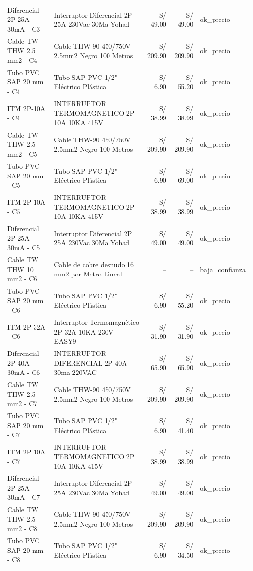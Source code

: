 \documentclass[11pt,a4paper]{article}
\begin{document}
\begin{longtable}{p{} p{} r r p{}}
Diferencial 2P-25A-30mA - C3 & Interruptor Diferencial 2P 25A 230Vac 30Ma Yohad & S/ 49.00 & S/ 49.00 & ok\_precio \\
Cable TW THW 2.5 mm2 - C4 & Cable THW-90 450/750V 2.5mm2 Negro 100 Metros & S/ 209.90 & S/ 209.90 & ok\_precio \\
Tubo PVC SAP 20 mm - C4 & Tubo SAP PVC 1/2" Eléctrico Plástica & S/ 6.90 & S/ 55.20 & ok\_precio \\
ITM 2P-10A - C4 & INTERRUPTOR TERMOMAGNETICO 2P 10A 10KA 415V & S/ 38.99 & S/ 38.99 & ok\_precio \\
Cable TW THW 2.5 mm2 - C5 & Cable THW-90 450/750V 2.5mm2 Negro 100 Metros & S/ 209.90 & S/ 209.90 & ok\_precio \\
Tubo PVC SAP 20 mm - C5 & Tubo SAP PVC 1/2" Eléctrico Plástica & S/ 6.90 & S/ 69.00 & ok\_precio \\
ITM 2P-10A - C5 & INTERRUPTOR TERMOMAGNETICO 2P 10A 10KA 415V & S/ 38.99 & S/ 38.99 & ok\_precio \\
Diferencial 2P-25A-30mA - C5 & Interruptor Diferencial 2P 25A 230Vac 30Ma Yohad & S/ 49.00 & S/ 49.00 & ok\_precio \\
Cable TW THW 10 mm2 - C6 & Cable de cobre desnudo 16 mm2 por Metro Lineal & -- & -- & baja\_confianza \\
Tubo PVC SAP 20 mm - C6 & Tubo SAP PVC 1/2" Eléctrico Plástica & S/ 6.90 & S/ 55.20 & ok\_precio \\
ITM 2P-32A - C6 & Interruptor Termomagnético 2P 32A 10KA 230V - EASY9 & S/ 31.90 & S/ 31.90 & ok\_precio \\
Diferencial 2P-40A-30mA - C6 & INTERRUPTOR DIFERENCIAL 2P 40A 30ma 220VAC & S/ 65.90 & S/ 65.90 & ok\_precio \\
Cable TW THW 2.5 mm2 - C7 & Cable THW-90 450/750V 2.5mm2 Negro 100 Metros & S/ 209.90 & S/ 209.90 & ok\_precio \\
Tubo PVC SAP 20 mm - C7 & Tubo SAP PVC 1/2" Eléctrico Plástica & S/ 6.90 & S/ 41.40 & ok\_precio \\
ITM 2P-10A - C7 & INTERRUPTOR TERMOMAGNETICO 2P 10A 10KA 415V & S/ 38.99 & S/ 38.99 & ok\_precio \\
Diferencial 2P-25A-30mA - C7 & Interruptor Diferencial 2P 25A 230Vac 30Ma Yohad & S/ 49.00 & S/ 49.00 & ok\_precio \\
Cable TW THW 2.5 mm2 - C8 & Cable THW-90 450/750V 2.5mm2 Negro 100 Metros & S/ 209.90 & S/ 209.90 & ok\_precio \\
Tubo PVC SAP 20 mm - C8 & Tubo SAP PVC 1/2" Eléctrico Plástica & S/ 6.90 & S/ 34.50 & ok\_precio \\

\end{longtable}
\end{document}
